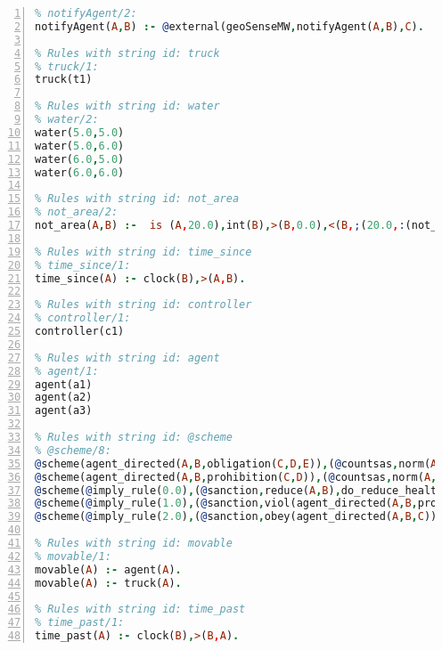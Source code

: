 \documentclass[11pt]{article}\usepackage[utf8]{inputenc}\usepackage{geometry}
\begin{document}
\begin{lstlisting}[language=Prolog, numbers=left]
% Rules with string id: notifyAgent
% notifyAgent/2:
notifyAgent(A,B) :- @external(geoSenseMW,notifyAgent(A,B),C).

% Rules with string id: truck
% truck/1:
truck(t1)

% Rules with string id: water
% water/2:
water(5.0,5.0)
water(5.0,6.0)
water(6.0,5.0)
water(6.0,6.0)

% Rules with string id: not_area
% not_area/2:
not_area(A,B) :-  is (A,20.0),int(B),>(B,0.0),<(B,;(20.0,:(not_area(A,B), is (-(B),20.0)))),int(A),>(A,0.0),<(A,;(20.0,:(area(A,B),-(int(A))))),int(B),>(A,0.0),>(B,0.0),<(A,21.0),<(B,21.0).

% Rules with string id: time_since
% time_since/1:
time_since(A) :- clock(B),>(A,B).

% Rules with string id: controller
% controller/1:
controller(c1)

% Rules with string id: agent
% agent/1:
agent(a1)
agent(a2)
agent(a3)

% Rules with string id: @scheme
% @scheme/8:
@scheme(agent_directed(A,B,obligation(C,D,E)),(@countsas,norm(A,B,F,obligation(C,D,E)),F),false,(listTrue(C)),(time_past(D)),false,[plus(viol(agent_directed(A,B,obligation(C,D,E))))|[]],[plus(obey(agent_directed(A,B,obligation(C,D,E))))|[]])
@scheme(agent_directed(A,B,prohibition(C,D)),(@countsas,norm(A,B,E,prohibition(C,D)),E),(listTrue(C)),false,(false),false,[plus(viol(agent_directed(A,B,prohibition(C,D))))|[]],[plus(obey(agent_directed(A,B,prohibition(C,D))))|[]])
@scheme(@imply_rule(0.0),(@sanction,reduce(A,B),do_reduce_health(A,B),notifyAgent(A,changed(status))),true,false,false,false,[min(reduce(A,B))|[]],[])
@scheme(@imply_rule(1.0),(@sanction,viol(agent_directed(A,B,prohibition(C,D))),do_sanction(D)),true,false,false,false,[min(viol(agent_directed(A,B,prohibition(C,D))))|[]],[])
@scheme(@imply_rule(2.0),(@sanction,obey(agent_directed(A,B,C))),true,false,false,false,[min(obey(agent_directed(A,B,C)))|[]],[])

% Rules with string id: movable
% movable/1:
movable(A) :- agent(A).
movable(A) :- truck(A).

% Rules with string id: time_past
% time_past/1:
time_past(A) :- clock(B),>(B,A).

\end{lstlisting}
\end{document}
